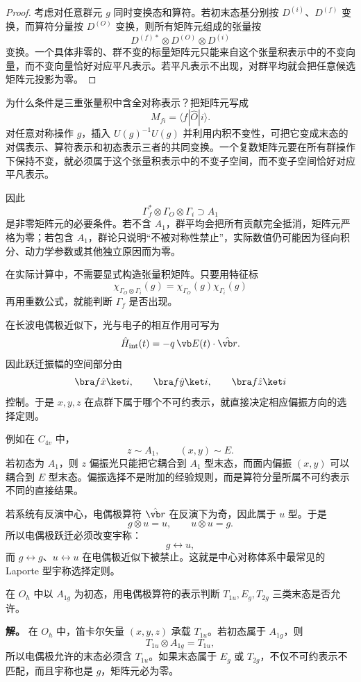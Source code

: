 \begin{proof}
考虑对任意群元 $g$ 同时变换态和算符。若初末态基分别按 $D^{(i)}$、$D^{(f)}$ 变换，而算符分量按 $D^{(O)}$ 变换，则所有矩阵元组成的张量按
\[
D^{(f)*}\otimes D^{(O)}\otimes D^{(i)}
\]
变换。一个具体非零的、群不变的标量矩阵元只能来自这个张量积表示中的不变向量，而不变向量恰好对应平凡表示。若平凡表示不出现，对群平均就会把任意候选矩阵元投影为零。
\end{proof}

为什么条件是三重张量积中含全对称表示？把矩阵元写成
\[
M_{fi}=\langle f|\hat O|i\rangle.
\]
对任意对称操作 $g$，插入 $U(g)^{-1}U(g)$ 并利用内积不变性，可把它变成末态的对偶表示、算符表示和初态表示三者的共同变换。一个复数矩阵元要在所有群操作下保持不变，就必须属于这个张量积表示中的不变子空间，而不变子空间恰好对应平凡表示。

因此
\[
\Gamma_f^*\otimes\Gamma_O\otimes\Gamma_i\supset A_1
\]
是非零矩阵元的必要条件。若不含 $A_1$，群平均会把所有贡献完全抵消，矩阵元严格为零；若包含 $A_1$，群论只说明“不被对称性禁止”，实际数值仍可能因为径向积分、动力学参数或其他独立原因而为零。

在实际计算中，不需要显式构造张量积矩阵。只要用特征标
\[
\chi_{\Gamma_O\otimes\Gamma_i}(g)
=\chi_{\Gamma_O}(g)\chi_{\Gamma_i}(g)
\]
再用重数公式，就能判断 $\Gamma_f$ 是否出现。

在长波电偶极近似下，光与电子的相互作用可写为
\[
\hat H_{\mathrm{int}}(t)
=-q\,\vb E(t)\cdot\hat{\vb r}.
\]
因此跃迁振幅的空间部分由
\[
\bra f\hat x\ket i,
\qquad
\bra f\hat y\ket i,
\qquad
\bra f\hat z\ket i
\]
控制。于是 $x,y,z$ 在点群下属于哪个不可约表示，就直接决定相应偏振方向的选择定则。

例如在 $C_{4v}$ 中，
\[
z\sim A_1,
\qquad
(x,y)\sim E.
\]
若初态为 $A_1$，则 $z$ 偏振光只能把它耦合到 $A_1$ 型末态，而面内偏振 $(x,y)$ 可以耦合到 $E$ 型末态。偏振选择不是附加的经验规则，而是算符分量所属不可约表示不同的直接结果。

若系统有反演中心，电偶极算符 $\hat{\vb r}$ 在反演下为奇，因此属于 $u$ 型。于是
\[
g\otimes u=u,
\qquad
u\otimes u=g.
\]
所以电偶极跃迁必须改变宇称：
\[
g\leftrightarrow u,
\]
而 $g\leftrightarrow g$、$u\leftrightarrow u$ 在电偶极近似下被禁止。这就是中心对称体系中最常见的 Laporte 型宇称选择定则。

\begin{example}[{$O_h$ 中的矢量算符}]
在 $O_h$ 中以 $A_{1g}$ 为初态，用电偶极算符的表示判断 $T_{1u},E_g,T_{2g}$ 三类末态是否允许。

\textbf{解。} 在 $O_h$ 中，笛卡尔矢量 $(x,y,z)$ 承载 $T_{1u}$。若初态属于 $A_{1g}$，则
\[
T_{1u}\otimes A_{1g}=T_{1u},
\]
所以电偶极允许的末态必须含 $T_{1u}$。如果末态属于 $E_g$ 或 $T_{2g}$，不仅不可约表示不匹配，而且宇称也是 $g$，矩阵元必为零。
\end{example}

